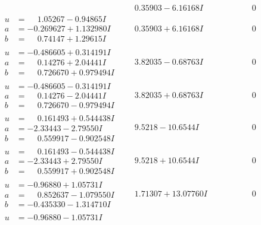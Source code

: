 \documentclass[1p]{elsarticle_modified}
\theoremstyle{definition}
\begin{document}
$$\begin{array}{c|c|c}
 & \phantom{-}0.35903 - 6.16168 I & \phantom{-0.000000 } 0 \\ \hline\begin{aligned}
u &= \phantom{-}1.05267 - 0.94865 I \\
a &= -0.269627 + 1.132980 I \\
b &= \phantom{-}0.74147 + 1.29615 I\end{aligned}
 & \phantom{-}0.35903 + 6.16168 I & \phantom{-0.000000 } 0 \\ \hline\begin{aligned}
u &= -0.486605 + 0.314191 I \\
a &= \phantom{-}0.14276 + 2.04441 I \\
b &= \phantom{-}0.726670 + 0.979494 I\end{aligned}
 & \phantom{-}3.82035 - 0.68763 I & \phantom{-0.000000 } 0 \\ \hline\begin{aligned}
u &= -0.486605 - 0.314191 I \\
a &= \phantom{-}0.14276 - 2.04441 I \\
b &= \phantom{-}0.726670 - 0.979494 I\end{aligned}
 & \phantom{-}3.82035 + 0.68763 I & \phantom{-0.000000 } 0 \\ \hline\begin{aligned}
u &= \phantom{-}0.161493 + 0.544438 I \\
a &= -2.33443 - 2.79550 I \\
b &= \phantom{-}0.559917 - 0.902548 I\end{aligned}
 & \phantom{-}9.5218 - 10.6544 I & \phantom{-0.000000 } 0 \\ \hline\begin{aligned}
u &= \phantom{-}0.161493 - 0.544438 I \\
a &= -2.33443 + 2.79550 I \\
b &= \phantom{-}0.559917 + 0.902548 I\end{aligned}
 & \phantom{-}9.5218 + 10.6544 I & \phantom{-0.000000 } 0 \\ \hline\begin{aligned}
u &= -0.96880 + 1.05731 I \\
a &= \phantom{-}0.852637 - 1.079550 I \\
b &= -0.435330 - 1.314710 I\end{aligned}
 & \phantom{-}1.71307 + 13.07760 I & \phantom{-0.000000 } 0 \\ \hline\begin{aligned}
u &= -0.96880 - 1.05731 I \\

\end{aligned}
\end{array}$$
\end{document}
